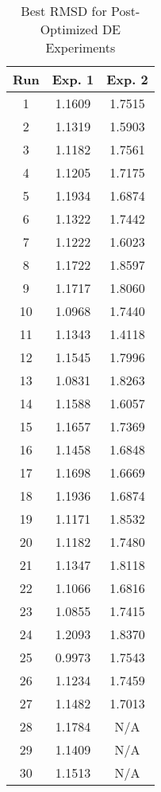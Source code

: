 \begin{table}
	\centering
	\begin{tabular}{ | c | c | c | }
		\hline
		Run & Exp. 1 & Exp. 2 \\ \hline
		1 & 1.1609 & 1.7515 \\ \hline
		2 & 1.1319 & 1.5903 \\ \hline
		3 & 1.1182 & 1.7561 \\ \hline
		4 & 1.1205 & 1.7175 \\ \hline
		5 & 1.1934 & 1.6874 \\ \hline
		6 & 1.1322 & 1.7442 \\ \hline
		7 & 1.1222 & 1.6023 \\ \hline
		8 & 1.1722 & 1.8597 \\ \hline
		9 & 1.1717 & 1.8060 \\ \hline
		10 & 1.0968 & 1.7440 \\ \hline
		11 & 1.1343 & 1.4118 \\ \hline
		12 & 1.1545 & 1.7996 \\ \hline
		13 & 1.0831 & 1.8263 \\ \hline
		14 & 1.1588 & 1.6057 \\ \hline
		15 & 1.1657 & 1.7369 \\ \hline
		16 & 1.1458 & 1.6848 \\ \hline
		17 & 1.1698 & 1.6669 \\ \hline
		18 & 1.1936 & 1.6874 \\ \hline
		19 & 1.1171 & 1.8532 \\ \hline
		20 & 1.1182 & 1.7480 \\ \hline
		21 & 1.1347 & 1.8118 \\ \hline
		22 & 1.1066 & 1.6816 \\ \hline
		23 & 1.0855 & 1.7415 \\ \hline
		24 & 1.2093 & 1.8370 \\ \hline
		25 & 0.9973 & 1.7543 \\ \hline
		26 & 1.1234 & 1.7459 \\ \hline
		27 & 1.1482 & 1.7013 \\ \hline
		28 & 1.1784 & N/A \\ \hline
		29 & 1.1409 & N/A \\ \hline
		30 & 1.1513 & N/A \\ \hline
	\end{tabular}
	\caption{Best RMSD for Post-Optimized DE Experiments}
	\label{table:appendix-post-de}
\end{table}


